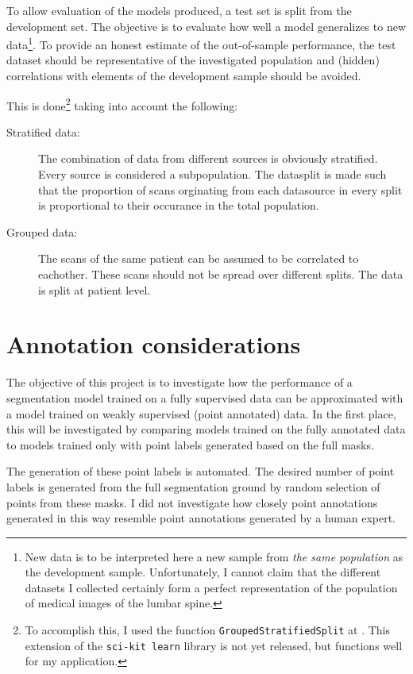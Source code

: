 To allow evaluation of the models produced, a test set is split from the development set.
The objective is to evaluate how well a model generalizes to new data\footnote{
    New data is to be interpreted here a new sample from \textit{the same population} as the development sample.
    Unfortunately, I cannot claim that the different datasets I collected certainly form a perfect representation of the population of medical images of the lumbar spine.}. 
To provide an honest estimate of the out-of-sample performance, the test dataset should be representative of the investigated population and (hidden) correlations with elements of the development sample should be avoided.

This is done\footnote{To accomplish this, I used the function \texttt{GroupedStratifiedSplit} at . This extension of the \texttt{sci-kit learn} library is not yet released, but functions well for my application.} taking into account the following:
\begin{description}
    \item[Stratified data:] The combination of data from different sources is obviously stratified. Every source is considered a subpopulation. The datasplit is made such that the proportion of scans orginating from each datasource in every split is proportional to their occurance in the total population.
    \item[Grouped data:] The scans of the same patient can be assumed to be correlated to eachother. These scans should not be spread over different splits. The data is split at patient level.
\end{description}


\section{Annotation considerations}

The objective of this project is to investigate how the performance of a segmentation model trained on a fully supervised data can be approximated with a model trained on weakly supervised (point annotated) data.
In the first place, this will be investigated by comparing models trained on the fully annotated data to models trained only with point labels generated based on the full masks.

The generation of these point labels is automated. 
The desired number of point labels is generated from the full segmentation ground by random selection of points from these masks.
I did not investigate how closely point annotations generated in this way resemble point annotations generated by a human expert. 